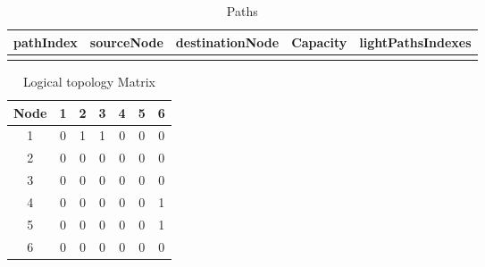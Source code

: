 \begin{table}[H]
	\centering
	\begin{tabular}{| c | c | c | c | c |}
		\hline
		\textbf{pathIndex} & \textbf{sourceNode} & \textbf{destinationNode} & \textbf{Capacity} & \textbf{lightPathsIndexes } \\ \hline
		&                     &                          &                          &                                         \\ \hline
	\end{tabular}               
	\caption{Paths}
	\label{paths}
\end{table}

\newpage
\vspace{20pt}

\begin{table}[H]
	\centering
	\begin{tabular}{| c | c | c | c | c | c | c |}
		\hline
		\textbf{Node} & 1 & 2 & 3 & 4 & 5 & 6 \\ \hline
		1             & 0 & 1 & 1 & 0 & 0 & 0 \\ \hline
		2             & 0 & 0 & 0 & 0 & 0 & 0 \\ \hline
		3             & 0 & 0 & 0 & 0 & 0 & 0 \\ \hline
		4			  & 0 & 0 & 0 & 0 & 0 & 1 \\ \hline	
		5    	      & 0 & 0 & 0 & 0 & 0 & 1 \\ \hline
		6			  & 0 & 0 & 0 & 0 & 0 & 0 \\ \hline
	\end{tabular}
	\caption{Logical topology Matrix}
	\label{logical_matrix}
\end{table}

